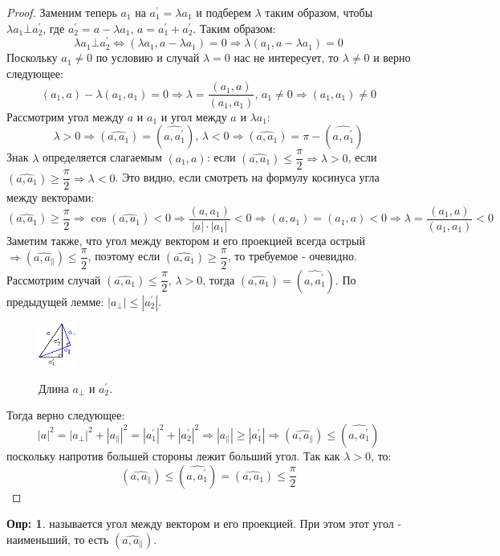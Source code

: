 \documentclass[12pt]{article}
\theoremstyle{definition}
\newtheorem{defn}{Опр:}
\begin{document}
\begin{proof}
	Заменим теперь $a_1$ на $a_1^\prime =  \lambda a_1$ и подберем $\lambda$ таким образом, чтобы $\lambda a_1 \bot a_2^\prime$, где $a_2^\prime = a - \lambda a_1, \, a = a_1^\prime + a_2^\prime$. Таким образом:
	$$
		\lambda a_1 \bot a_2^\prime \Leftrightarrow (\lambda a_1, a - \lambda a_1) = 0 \Rightarrow \lambda (a_1, a - \lambda a_1) = 0
	$$
	Поскольку $a_1 \neq 0$ по условию и случай $\lambda = 0$ нас не интересует, то $\lambda \neq 0$ и верно следующее: 
	$$	
		(a_1,a) - \lambda (a_1,a_1) = 0 \Rightarrow \lambda = \dfrac{(a_1,a)}{(a_1,a_1)}, \, a_1 \neq 0 \Rightarrow (a_1,a_1) \neq 0
	$$
	Рассмотрим угол между $a$ и $a_1$ и угол между $a$ и $\lambda a_1$: 
	$$
		\lambda > 0 \Rightarrow (\widehat{a,a_1}) = (\widehat{a,a_1^\prime}), \, \lambda < 0 \Rightarrow (\widehat{a,a_1}) = \pi - (\widehat{a,a_1^\prime})
	$$
	Знак $\lambda$ определяется слагаемым $(a_1,a)$: если $(\widehat{a,a_1}) \leq \dfrac{\pi}{2} \Rightarrow \lambda > 0$, если $(\widehat{a,a_1}) \geq \dfrac{\pi}{2} \Rightarrow \lambda < 0$. Это видно, если смотреть на формулу косинуса угла между векторами: 
	$$
		(\widehat{a,a_1}) \geq \dfrac{\pi}{2} \Rightarrow \cos(\widehat{a,a_1}) < 0 \Rightarrow \dfrac{(a,a_1)}{|a|{\cdot}|a_1|} < 0 \Rightarrow (a,a_1) = (a_1,a) < 0 \Rightarrow \lambda = \dfrac{(a_1,a)}{(a_1,a_1)} < 0
	$$
	Заметим также, что угол между вектором и его проекцией всегда острый $\Rightarrow (\widehat{a,a_{\|}}) \leq \dfrac{\pi}{2}$, поэтому если $(\widehat{a,a_1}) \geq \dfrac{\pi}{2}$, то требуемое - очевидно. Рассмотрим случай $(\widehat{a,a_1}) \leq \dfrac{\pi}{2}, \, \lambda >0$, тогда $(\widehat{a,a_1}) = (\widehat{a,a_1^\prime})$. По предыдущей лемме: $|a_\bot| \leq |a_2^\prime|$.
	\begin{figure}[H]
		\centering
		\includegraphics[width=0.11\textwidth]{7_2.eps}
		\label{7_2}
		\caption{Длина $a_\bot$ и $a_2^\prime$.}
		\label{fig:Расстояние от $a$ до $L$}
	\end{figure}
	Тогда верно следующее:
	$$
		|a|^2 = |a_\bot|^2 + |a_{\|}|^2 = |a_1^\prime|^2 + |a_2^\prime|^2 \Rightarrow |a_{\|}| \geq |a_1^\prime| \Rightarrow (\widehat{a,a_{\|}}) \leq (\widehat{a,a_1^\prime})
	$$
	поскольку напротив большей стороны лежит больший угол. Так как $\lambda >0$, то:
	$$
		(\widehat{a,a_{\|}}) \leq (\widehat{a,a_1^\prime}) = (\widehat{a,a_1}) \leq \dfrac{\pi}{2}
	$$
\end{proof}
\begin{defn}
	 называется угол между вектором и его проекцией. При этом этот угол - наименьший, то есть $(\widehat{a,a_{\|}})$.
\end{defn}
\newpage
\end{document}
